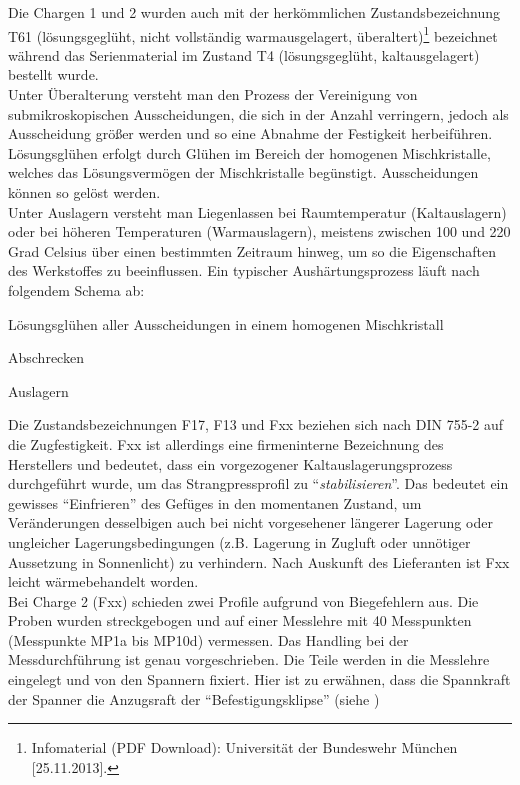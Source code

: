 \documentclass[12pt,a4paper,parskip,twoside,BCOR5mm,headsepline]{scrartcl}
\begin{document}
 Die Chargen 1 und 2 wurden auch mit der herkömmlichen Zustandsbezeichnung T61 (lösungsgeglüht, nicht vollständig warmausgelagert, überaltert)\footnote{Infomaterial (PDF Download): Universität der Bundeswehr München [25.11.2013].} bezeichnet während das Serienmaterial im Zustand T4 (lösungsgeglüht, kaltausgelagert) bestellt wurde. \\
 Unter Überalterung versteht man  den Prozess der Vereinigung von  submikroskopischen Ausscheidungen, die sich  in der Anzahl verringern, jedoch als Ausscheidung größer werden und so eine Abnahme der Festigkeit herbeiführen. \autocite[52]{wki}\\
  Lösungsglühen erfolgt durch Glühen im Bereich der homogenen Mischkristalle, welches das   Lösungsvermögen der Mischkristalle begünstigt. Ausscheidungen können so gelöst werden.\\
   Unter Auslagern versteht man Liegenlassen bei Raumtemperatur (Kaltauslagern) oder bei  höheren Temperaturen (Warmauslagern), meistens zwischen 100 und 220 Grad Celsius über einen bestimmten Zeitraum hinweg, um so die Eigenschaften des Werkstoffes zu beeinflussen. \autocite[213]{wk}
Ein typischer Aushärtungsprozess läuft nach folgendem Schema ab:
\begin{enumerate*}
 \item Lösungsglühen aller Ausscheidungen in einem homogenen Mischkristall 
 \item Abschrecken
 \item Auslagern 
 \end{enumerate*}
Die Zustandsbezeichnungen F17, F13 und Fxx beziehen sich nach DIN 755-2 auf die Zugfestigkeit. Fxx ist allerdings eine firmeninterne Bezeichnung des Herstellers und bedeutet, dass ein  vorgezogener Kaltauslagerungsprozess durchgeführt wurde, um das Strangpressprofil zu "`\emph{stabilisieren}"'. Das bedeutet ein gewisses "`Einfrieren"' des Gefüges in den momentanen Zustand, um Veränderungen desselbigen auch bei nicht vorgesehener längerer Lagerung oder ungleicher Lagerungsbedingungen (z.B. Lagerung in Zugluft oder unnötiger Aussetzung in Sonnenlicht) zu verhindern. Nach Auskunft des Lieferanten ist Fxx leicht wärmebehandelt worden.\\
Bei Charge 2 (Fxx) schieden zwei Profile aufgrund von Biegefehlern aus. Die Proben wurden streckgebogen und auf einer Messlehre  mit 40 Messpunkten (Messpunkte MP1a bis MP10d) vermessen. Das Handling bei der Messdurchführung ist genau vorgeschrieben. Die Teile werden in die Messlehre eingelegt und von den Spannern fixiert. Hier ist zu erwähnen, dass die Spannkraft der Spanner die Anzugsraft der "`Befestigungsklipse"' (siehe )
\end{document}
